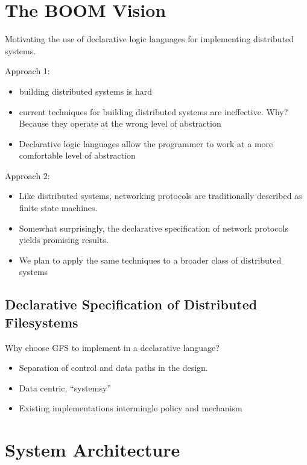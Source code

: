 \documentclass{article}
\begin{document}
\section{The BOOM Vision}
Motivating the use of declarative logic languages for implementing
distributed systems.

Approach 1:
\begin{itemize}
\item
  building distributed systems is hard

\item
  current techniques for building distributed systems are
  ineffective. Why? Because they operate at the wrong level of
  abstraction

\item
  Declarative logic languages allow the programmer to work at a more
  comfortable level of abstraction
\end{itemize}

Approach 2:
\begin{itemize}
\item
  Like distributed systems, networking protocols are traditionally
  described as finite state machines.

\item 
  Somewhat surprisingly, the declarative specification of network
  protocols yields promising results.

\item 
  We plan to apply the same techniques to a broader class of
  distributed systems
\end{itemize}

\subsection{Declarative Specification of Distributed Filesystems}
Why choose GFS to implement in a declarative language?
\begin{itemize}
\item
  Separation of control and data paths in the design.

\item
  Data centric, ``systemsy''

\item
  Existing implementations intermingle policy and mechanism
\end{itemize}

\section{System Architecture}
\end{document}
